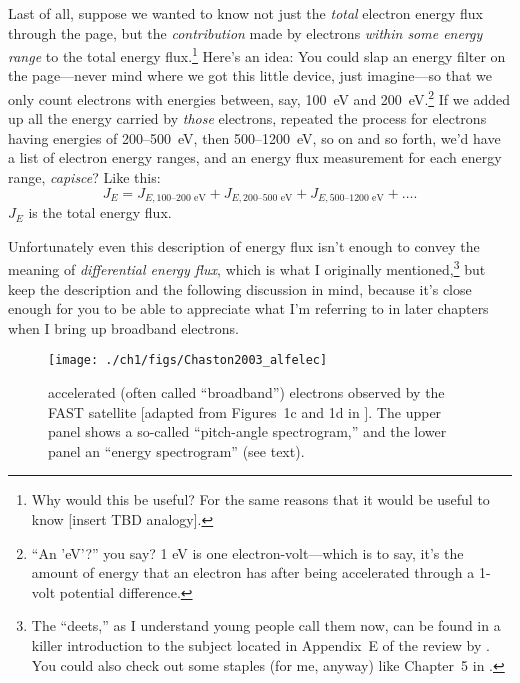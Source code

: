 Last of all, suppose we wanted to know not just the \emph{total}
electron energy flux through the page, but the \emph{contribution}
made by electrons \emph{within some energy range} to the total energy
flux.\footnote{Why would this be useful?  For the same reasons that it
  would be useful to know [insert TBD analogy].}  Here's an idea: You
could slap an energy filter on the page---never mind where we got this
little device, just imagine---so that we only count electrons with
energies between, say, 100~eV and 200~eV.\footnote{``An 'eV'?''  you
  say? 1 eV is one electron-volt---which is to say, it's the amount of
  energy that an electron has after being accelerated through a 1-volt
  potential difference.} If we added up all the energy carried by
\emph{those} electrons, repeated the process for electrons having
energies of 200--500~eV, then 500--1200~eV, so on and so forth, we'd
have a list of electron energy ranges, and an energy flux measurement
for each energy range, \emph{capisce}? Like this:
\begin{equation}
  \label{ch1:eqeFlux}
  J_{E} = J_{E,\textrm{100--200 eV}} + J_{E,\textrm{200--500 eV}} + J_{E,\textrm{500--1200 eV}} + \dots .
\end{equation}
$J_E$ is the total energy flux.

Unfortunately even this description of energy flux isn't enough to
convey the meaning of \emph{differential energy flux}, which is what I
originally mentioned,\footnote{The ``deets,'' as I understand young
  people call them now, can be found in a killer introduction to the
  subject located in Appendix~E of the review by
  \citet{Bruno2013}. You could also check out some staples (for me,
  anyway) like Chapter~5 in \citet{Paschmann1998}.} but keep the
description and the following discussion in mind, because it's close
enough for you to be able to appreciate what I'm referring to in later
chapters when I bring up broadband electrons.


\begin{figure}
  \centering
  \noindent\texttt{[image: ./ch1/figs/Chaston2003\_alfelec]}
  \caption[\Alfically accelerated (broadband) electrons]{\Alfically
    accelerated (often called ``broadband'') electrons observed by
    the FAST satellite [adapted from Figures~1c and 1d in
    \citealp{Chaston2003a}]. The upper panel shows a so-called
    ``pitch-angle spectrogram,'' and the lower panel an ``energy
    spectrogram'' (see text).}
  \label{ch1:FigAlfElec}
\end{figure}

